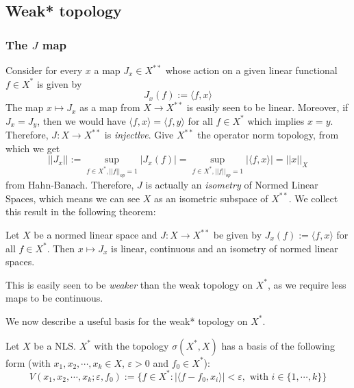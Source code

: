 \subsection{Weak* topology}
\subsubsection{The $J$ map}
Consider for every $x$ a map $J_x \in X^{**}$ whose action on a given linear functional $f\in X^*$ is given by \begin{equation}
    J_x(f):=\langle f,x\rangle
\end{equation}
The map $x\mapsto J_x$ as a map from $X\to X^{**}$ is easily seen to be linear. Moreover, if $J_x=J_y$, then we would have $\langle f,x\rangle=\langle f,y\rangle$ for all $f\in X^*$ which implies $x=y$. Therefore, $J:X\to X^{**}$ is \emph{injectlve}. Give $X^{**}$ the operator norm topology, from which we get $$||J_x||:= \sup_{f\in X^*, ||f||_{op}=1} |J_x(f)|= \sup_{f\in X^*, ||f||_{op}=1} |\langle f,x\rangle|=||x||_{X}$$ from Hahn-Banach.
Therefore, $J$ is actually an \emph{isometry} of Normed Linear Spaces, which means we can see $X$ as an isometric subspace of $X^{**}$. We collect this result in the following theorem:
\begin{theorem}\label{thm:X_isometry_to_X**}
Let $X$ be a normed linear space and $J:X\to X^{**}$ be given by $J_x(f):=\langle f,x\rangle$ for all $f\in X^*$. Then $x\mapsto J_x$ is linear, continuous and an isometry of normed linear spaces.    
\end{theorem}

\begin{remark}
 This is easily seen to be \emph{weaker} than the weak topology on $X^*$, as we require less maps to be continuous.

\end{remark}
We now describe a useful basis for the weak* topology on $X^*$.
\begin{proposition}
    Let $X$ be a NLS. $X^*$ with the topology $\sigma(X^*,X)$ has a basis of the following form (with $x_1,x_2,\cdots,x_k \in X$, $\varepsilon>0$ and $f_0\in X^*$): $$V(x_1,x_2,\cdots,x_k;\varepsilon,f_0):=\{f\in X^*: |\langle f-f_0,x_i\rangle|<\varepsilon, \text{ with }i\in\{1,\cdots,k\}\}$$
\end{proposition}

